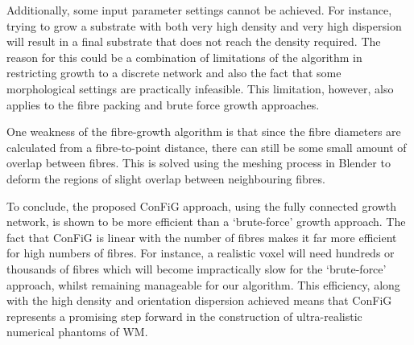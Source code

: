 Additionally, some input parameter settings cannot be achieved.
For instance, trying to grow a substrate with both very high density and very high dispersion will result in a final substrate that does not reach the density required.
The reason for this could be a combination of limitations of the algorithm in restricting growth to a discrete network and also the fact that some morphological settings are practically infeasible.
This limitation, however, also applies to the fibre packing and  brute force growth approaches.  

One weakness of the fibre-growth algorithm is that since the fibre diameters are calculated from a fibre-to-point distance, there can still be some small amount of overlap between fibres.
This is solved using the meshing process in Blender to deform the regions of slight overlap between neighbouring fibres. 

To conclude, the proposed ConFiG approach, using the fully connected growth network, is shown to be more efficient than a `brute-force' growth approach.
The fact that ConFiG is linear with the number of fibres makes it far more efficient for high numbers of fibres. For instance, a realistic voxel will need hundreds or thousands of fibres which will become impractically slow for the `brute-force' approach, whilst remaining manageable for our algorithm.
This efficiency, along with the high density and orientation dispersion achieved means that ConFiG represents a promising step forward in the construction of ultra-realistic numerical phantoms of WM.


